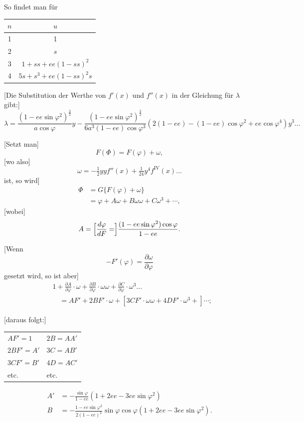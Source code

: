 \documentclass[12pt,a4paper]{article}
\begin{document}
So findet man für
\begin{center}
\begin{tabular}{c|c}
$n$ & $u$\\
\hline
1 & 1\\
2 & $s$\\
3 & $1 + ss + ee(1-ss)^2$\\
4 & $5s + s^3 + ee(1-ss)^2s$
\end{tabular}
\end{center}

[Die Substitution der Werthe von $f'(x)$ und $f''(x)$ in der Gleichung für $\lambda$ gibt:]
\[
\lambda = \frac{(1-ee\sin\varphi^2)^{\frac{3}{2}}}{a\cos\varphi}y - \frac{(1-ee\sin\varphi^2)^{\frac{3}{2}}}{6a^3(1-ee)\cos\varphi^3}(2(1-ee)-(1-ee)\cos\varphi^2+ee\cos\varphi^4)y^3\ldots
\]

[Setzt man]
\[
F(\Phi) = F(\varphi) + \omega,
\]
[wo also]
\[
\omega = -\tfrac{1}{2}yyf''(x) + \tfrac{1}{24}y^4f^{\mathrm{IV}}(x)\ldots
\]
ist, so wird]
\begin{align*}
\Phi &= G\{F(\varphi) + \omega\}\\
&= \varphi + A\omega + B\omega\omega + C\omega^3 + \cdots,
\end{align*}
[wobei]
\[
A = \Bigl[\frac{d\varphi}{dF}=\Bigr]\frac{(1-ee\sin\varphi^2)\cos\varphi}{1-ee}.
\]

[Wenn
\[
-F'(\varphi) = \frac{\partial\omega}{\partial\varphi}
\]
gesetzt wird, so ist aber]
\begin{align*}
&1 + \frac{\partial A}{\partial\varphi}\cdot\omega + \frac{\partial B}{\partial\varphi}\cdot\omega\omega + \frac{\partial C}{\partial\varphi}\cdot\omega^3\ldots\\
&\quad = AF' + 2BF'\cdot\omega + [3CF'\cdot\omega\omega + 4DF'\cdot\omega^3 +]\cdots;
\end{align*}

[daraus folgt:]
\begin{center}
\begin{tabular}{ll}
$AF' = 1$ & $2B = AA'$\\
$2BF' = A'$ & $3C = AB'$\\
$3CF' = B'$ & $4D = AC'$\\
\quad etc. & \quad etc.
\end{tabular}
\end{center}
\begin{align*}
A' &= -\frac{\sin\varphi}{1-ee}(1+2ee-3ee\sin\varphi^2)\\
B &= -\frac{1-ee\sin\varphi^2}{2(1-ee)^2}\sin\varphi\cos\varphi(1+2ee-3ee\sin\varphi^2).
\end{align*}
\end{document}
